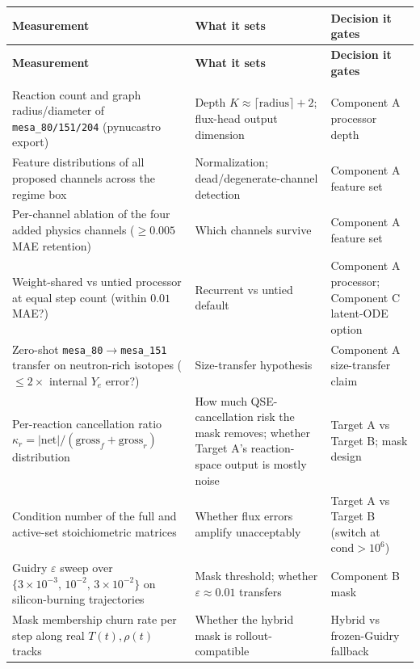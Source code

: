 \documentclass[11pt]{article}
\newcommand{\msn}[1]{\texttt{mesa\_#1}}
\newcommand{\Ye}{Y_{e}}
\begin{document}
\begin{longtable}{@{}>{\raggedright\arraybackslash}p{} >{\raggedright\arraybackslash}p{} >{\raggedright\arraybackslash}p{}@{}}
\toprule
\textbf{Measurement} & \textbf{What it sets} & \textbf{Decision it gates} \\
\midrule
\endfirsthead
\toprule
\textbf{Measurement} & \textbf{What it sets} & \textbf{Decision it gates} \\
\midrule
\endhead
\midrule
\multicolumn{3}{r}{\footnotesize\itshape continued on next page}\\
\endfoot
\bottomrule
\endlastfoot
Reaction count and graph radius/diameter of \msn{80/151/204} (pynucastro export) & Depth $K \approx \lceil\text{radius}\rceil + 2$; flux-head output dimension & Component A processor depth \\
\addlinespace
Feature distributions of all proposed channels across the regime box & Normalization; dead/degenerate-channel detection & Component A feature set \\
\addlinespace
Per-channel ablation of the four added physics channels ($\ge 0.005$ MAE retention) & Which channels survive & Component A feature set \\
\addlinespace
Weight-shared vs untied processor at equal step count (within $0.01$ MAE?) & Recurrent vs untied default & Component A processor; Component C latent-ODE option \\
\addlinespace
Zero-shot \msn{80}$\to$\msn{151} transfer on neutron-rich isotopes ($\le 2\times$ internal $\Ye$ error?) & Size-transfer hypothesis & Component A size-transfer claim \\
\addlinespace
Per-reaction cancellation ratio $\kappa_r = |\mathrm{net}|/(\mathrm{gross}_f + \mathrm{gross}_r)$ distribution & How much QSE-cancellation risk the mask removes; whether Target A's reaction-space output is mostly noise & Target A vs Target B; mask design \\
\addlinespace
Condition number of the full and active-set stoichiometric matrices & Whether flux errors amplify unacceptably & Target A vs Target B (switch at $\mathrm{cond} > 10^{6}$) \\
\addlinespace
Guidry $\varepsilon$ sweep over $\{3\times10^{-3},\, 10^{-2},\, 3\times10^{-2}\}$ on silicon-burning trajectories & Mask threshold; whether $\varepsilon \approx 0.01$ transfers & Component B mask \\
\addlinespace
Mask membership churn rate per step along real $T(t), \rho(t)$ tracks & Whether the hybrid mask is rollout-compatible & Hybrid vs frozen-Guidry fallback \\

\end{longtable}
\end{document}
